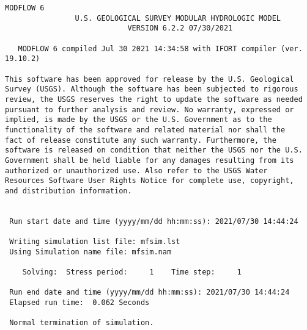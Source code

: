 {\small
\begin{lstlisting}[style=modeloutput]
                                   MODFLOW 6
                U.S. GEOLOGICAL SURVEY MODULAR HYDROLOGIC MODEL
                            VERSION 6.2.2 07/30/2021

   MODFLOW 6 compiled Jul 30 2021 14:34:58 with IFORT compiler (ver. 19.10.2)

This software has been approved for release by the U.S. Geological
Survey (USGS). Although the software has been subjected to rigorous
review, the USGS reserves the right to update the software as needed
pursuant to further analysis and review. No warranty, expressed or
implied, is made by the USGS or the U.S. Government as to the
functionality of the software and related material nor shall the
fact of release constitute any such warranty. Furthermore, the
software is released on condition that neither the USGS nor the U.S.
Government shall be held liable for any damages resulting from its
authorized or unauthorized use. Also refer to the USGS Water
Resources Software User Rights Notice for complete use, copyright,
and distribution information.


 Run start date and time (yyyy/mm/dd hh:mm:ss): 2021/07/30 14:44:24

 Writing simulation list file: mfsim.lst
 Using Simulation name file: mfsim.nam

    Solving:  Stress period:     1    Time step:     1

 Run end date and time (yyyy/mm/dd hh:mm:ss): 2021/07/30 14:44:24
 Elapsed run time:  0.062 Seconds

 Normal termination of simulation.

\end{lstlisting}
}
